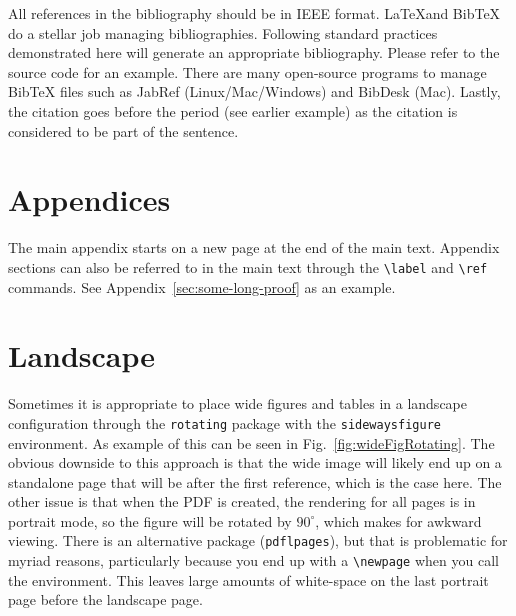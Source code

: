 All references in the bibliography should be in IEEE format. \LaTeX and BibTeX do a stellar job managing bibliographies.  Following standard practices demonstrated here will generate an appropriate bibliography.  Please refer to the source code for an example\cite{pauly1991parameter}.  There are many open-source programs to manage BibTeX files such as JabRef (Linux/Mac/Windows) and BibDesk (Mac).  Lastly, the citation goes before the period (see earlier example) as the citation is considered to be part of the sentence.

\section{Appendices}
\label{sec:appendices}

The main appendix starts on a new page at the end of the main text.  Appendix sections can also be referred to in the main text through the \verb+\label+ and \verb+\ref+ commands. See Appendix~\ref{sec:some-long-proof} as an example.

\section{Landscape}
\label{sec:landscape}

Sometimes it is appropriate to place wide figures and tables in a landscape configuration through the \verb+rotating+ package with the \verb+sidewaysfigure+ environment.  As example of this can be seen in Fig.~\ref{fig:wideFigRotating}.  The obvious downside to this approach is that the wide image will likely end up on a standalone page that will be after the first reference, which is the case here.  The other issue is that when the PDF is created, the rendering for all pages is in portrait mode, so the figure will be rotated by $90^\circ$, which makes for awkward viewing.   There is an alternative package (\verb+pdflpages+), but that is problematic for myriad reasons, particularly because you end up with a \verb+\newpage+ when you call the environment.  This leaves large amounts of white-space on the last portrait page before the landscape page.  

